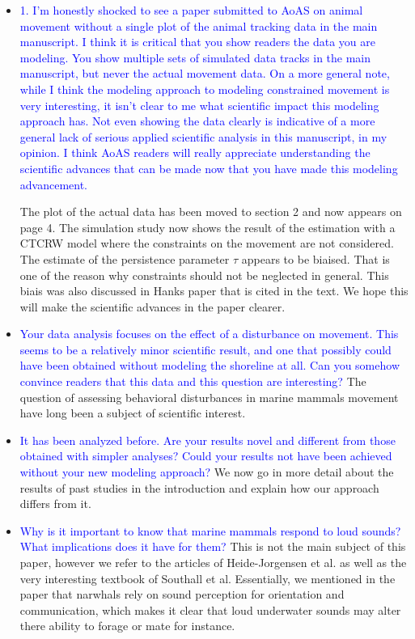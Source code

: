 \documentclass{amsart}
\theoremstyle{plain}
\theoremstyle{remark}
\newcommand {\1}{\mathbb{1}}
\begin{document}
\begin{itemize}
    \item \textcolor{blue}{1.	I’m honestly shocked to see a paper submitted to AoAS on animal movement without a single plot of the animal tracking data in the main manuscript.  I think it is critical that you show readers the data you are modeling.  You show multiple sets of simulated data tracks in the main manuscript, but never the actual movement data.  On a more general note, while I think the modeling approach to  modeling constrained movement is very interesting, it isn’t clear to me what scientific impact this modeling approach has.  Not even showing the data clearly is indicative of a more general lack of serious applied scientific analysis in this manuscript, in my opinion.  I think AoAS readers will really appreciate understanding the scientific advances that can be made now that you have made this modeling advancement.    }

    

    The plot of the actual data has been moved to section 2 and now appears on page 4. The simulation study now shows the result of the estimation with a CTCRW model where the constraints on the movement are not considered. The estimate of the persistence parameter $\tau$ appears to be biaised. That is one of the reason why constraints should not be neglected in general. This biais was also discussed in Hanks paper that is cited in the text.
    We hope this will make the scientific advances in the paper clearer.
    \item \textcolor{blue}{Your data analysis focuses on the effect of a disturbance on movement.  This seems to be a relatively minor scientific result, and one that possibly could have been obtained without modeling the shoreline at all.  Can you somehow convince readers that this data and this question are interesting? }
    The question of assessing behavioral disturbances in marine mammals movement have long been a subject of scientific interest.

    \item \textcolor{blue}{It has been analyzed before.  Are your results novel and different from those obtained with simpler analyses?  Could your results not have been achieved without your new modeling approach?} 
    We now go in more detail about the results of past studies in the introduction and explain how our approach differs from it.
    
    \item \textcolor{blue}{ Why is it important to know that marine mammals respond to loud sounds?  What implications does it have for them? }
    This is not the main subject of this paper, however we refer to the articles of Heide-Jorgensen et al. as well as the very interesting textbook of Southall et al. Essentially, we mentioned in the paper that narwhals rely on sound perception for orientation and communication, which makes it clear that loud underwater sounds may alter there ability to forage or mate for instance.


\end{itemize}
\end{document}
